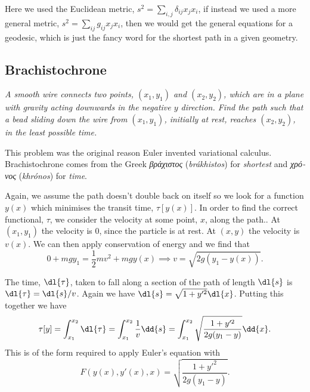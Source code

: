 \documentclass[fleqn]{NotesClass}
\begin{document}
    Here we used the Euclidean metric, \(s^2 = \sum_{i,j}\delta_{ij}x_jx_i\), if instead we used a more general metric, \(s^2 = \sum_{ij} g_{ij}x_jx_i\), then we would get the general equations for a geodesic, which is just the fancy word for the shortest path in a given geometry.
    
    \subsection{Brachistochrone}
    \textit{A smooth wire connects two points, \((x_1, y_1)\) and \((x_2, y_2)\), which are in a plane with gravity acting downwards in the negative \(y\) direction. Find the path such that a bead sliding down the wire from \((x_1, y_1)\), initially at rest, reaches \((x_2, y_2)\), in the least possible time.}
    
    \begin{rmk}
        This problem was the original reason Euler invented variational calculus.
        Brachistochrone comes from the Greek \textit{\textgreek{βράχιστος}} (\textit{brákhistos}) for \textit{shortest} and \textit{\textgreek{χρόνος}} (\textit{khrónos}) for \textit{time}.
    \end{rmk}
    
    Again, we assume the path doesn't double back on itself so we look for a function \(y(x)\) which minimises the transit time, \(\tau[y(x)]\).
    In order to find the correct functional, \(\tau\), we consider the velocity at some point, \(x\), along the path..
    At \((x_1, y_1)\) the velocity is \(0\), since the particle is at rest.
    At \((x, y)\) the velocity is \(v(x)\).
    We can then apply conservation of energy and we find that
    \begin{equation}
        0 + mgy_1 = \frac{1}{2}mv^2 + mgy(x) \implies v = \sqrt{2g (y_1 - y(x))}.
    \end{equation}
    
    The time, \(\dl{\tau}\), taken to fall along a section of the path of length \(\dl{s}\) is \(\dl{\tau} = \dl{s}/v\).
    Again we have \(\dl{s} = \sqrt{1 + y'^2}\dl{x}\).
    Putting this together we have
    \begin{equation}
        \tau[y] = \int_{x_1}^{x_2} \dl{\tau} = \int_{x_1}^{x_2} \frac{1}{v}\dd{s} = \int_{x_1}^{x_2} \sqrt{\frac{1 + y'^2}{2g(y_1 - y)}} \dd{x}.
    \end{equation}
    This is of the form required to apply Euler's equation with
    \begin{equation}
        F(y(x), y'(x), x) = \sqrt{\frac{1 + y'^2}{2g(y_1 - y)}}.
    \end{equation}
    
\end{document}
